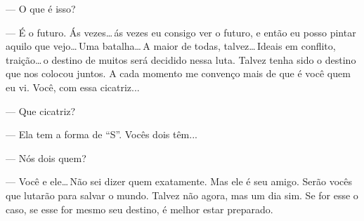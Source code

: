 --- O que é isso?

--- É o futuro. Ás vezes\ldots\,ás vezes eu consigo ver o futuro, e
então eu posso pintar aquilo que vejo\ldots\,Uma batalha\ldots\,A maior
de todas, talvez\ldots\,Ideais em conflito, traição\ldots\,o destino de
muitos será decidido nessa luta. Talvez tenha sido o destino que nos
colocou juntos. A cada momento me convenço mais de que é você quem eu
vi. Você, com essa cicatriz...

--- Que cicatriz?

--- Ela tem a forma de “S”. Vocês dois têm...

--- Nós dois quem?

--- Você e ele\ldots\,Não sei dizer quem exatamente. Mas ele é seu
amigo. Serão vocês que lutarão para salvar o mundo. Talvez não agora,
mas um dia sim. Se for esse o caso, se esse for mesmo seu destino, é
melhor estar preparado.
